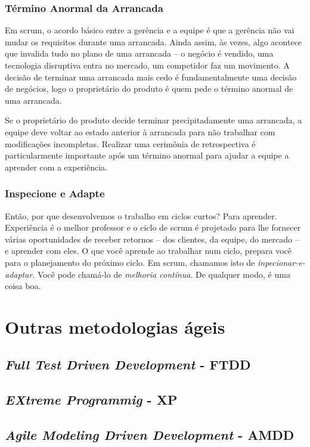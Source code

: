 \documentclass[
	11pt,				%
	openright,
	twoside,			%
	a4paper,			%
	english,			%
	french,
	brazil,				%
	sumario=tradicional
	]{abntex2}
\begin{document}
\subsubsection{Término Anormal da Arrancada}

Em scrum, o acordo básico entre a gerência e a equipe é que a gerência não vai mudar os requisitos durante uma arrancada. Ainda assim, às vezes, algo acontece que invalida tudo no plano de uma arrancada -- o negócio é vendido, uma tecnologia disruptiva entra no mercado, um competidor faz um movimento. A decisão de terminar uma arrancada mais cedo é fundamentalmente uma decisão de negócios, logo o proprietário do produto é quem pede o término anormal de uma arrancada.

Se o proprietário do produto decide terminar precipitadamente uma arrancada, a equipe deve voltar ao estado anterior à arrancada para não trabalhar com modificações incompletas. Realizar uma cerimônia de retrospectiva é particularmente importante após um término anormal para ajudar a equipe a aprender com a experiência.

\subsubsection{Inspecione e Adapte}

Então, por que desenvolvemos o trabalho em ciclos curtos? Para aprender. Experiência é o melhor professor e o ciclo de scrum é projetado para lhe fornecer várias oportunidades de receber retornos -- dos clientes, da equipe, do mercado -- e aprender com eles.
O que você aprende ao trabalhar num ciclo, prepara você para o planejamento do próximo ciclo. Em scrum, chamamos isto de \emph{inpecionar-e-adaptar}. Você pode chamá-lo de \emph{melhoria contínua}. De qualquer modo, é uma coisa boa.

\section{Outras metodologias ágeis}
\subsection{\emph{Full Test Driven Development} - FTDD}
\subsection{\emph{EXtreme Programmig} - XP}
\subsection{\emph{Agile Modeling Driven Development} - AMDD}
\end{document}
